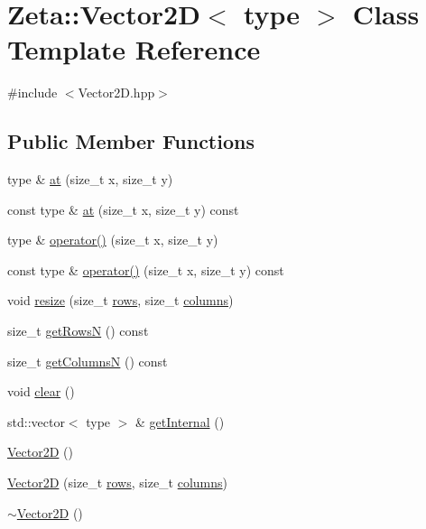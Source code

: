 \hypertarget{classZeta_1_1Vector2D}{\section{Zeta\+:\+:Vector2\+D$<$ type $>$ Class Template Reference}
\label{classZeta_1_1Vector2D}
}


{\ttfamily \#include $<$Vector2\+D.\+hpp$>$}

\subsection*{Public Member Functions}
\begin{DoxyCompactItemize}
\item 
type \& \hyperlink{classZeta_1_1Vector2D_aa5bb07151da5e2ba475078e37a0d9608}{at} (size\+\_\+t x, size\+\_\+t y)
\item 
const type \& \hyperlink{classZeta_1_1Vector2D_a71430a7a1ead2a5bf0a32481e93ca91e}{at} (size\+\_\+t x, size\+\_\+t y) const 
\item 
type \& \hyperlink{classZeta_1_1Vector2D_a05c0ce31d9724e18cfc91bb91300a3ae}{operator()} (size\+\_\+t x, size\+\_\+t y)
\item 
const type \& \hyperlink{classZeta_1_1Vector2D_ad251a6c395f715b33a04d38e53d282e1}{operator()} (size\+\_\+t x, size\+\_\+t y) const 
\item 
void \hyperlink{classZeta_1_1Vector2D_abc4aff7ad467fec2e27e1a3cb00efbe6}{resize} (size\+\_\+t \hyperlink{classZeta_1_1Vector2D_a2aca070e9e69cc69174038b3dd563826}{rows}, size\+\_\+t \hyperlink{classZeta_1_1Vector2D_abd3d1cc04c6700981eb80163689a9f26}{columns})
\item 
size\+\_\+t \hyperlink{classZeta_1_1Vector2D_a2a604f58397c45825bfb0c6e79895c0e}{get\+Rows\+N} () const 
\item 
size\+\_\+t \hyperlink{classZeta_1_1Vector2D_a6636373bd98556043fef4b953ced01df}{get\+Columns\+N} () const 
\item 
void \hyperlink{classZeta_1_1Vector2D_a075af7fb64206600bb641cd16a9a0c3c}{clear} ()
\item 
std\+::vector$<$ type $>$ \& \hyperlink{classZeta_1_1Vector2D_a5104f7b2b243cb3300fd85d2caf85f39}{get\+Internal} ()
\item 
\hyperlink{classZeta_1_1Vector2D_a26d951b60e9710a1d7c371a12d9d65c2}{Vector2\+D} ()
\item 
\hyperlink{classZeta_1_1Vector2D_aa091c3f8e68acc851db042633ac2f5da}{Vector2\+D} (size\+\_\+t \hyperlink{classZeta_1_1Vector2D_a2aca070e9e69cc69174038b3dd563826}{rows}, size\+\_\+t \hyperlink{classZeta_1_1Vector2D_abd3d1cc04c6700981eb80163689a9f26}{columns})
\item 
\hyperlink{classZeta_1_1Vector2D_a615413c722631ee2321c859a261920df}{$\sim$\+Vector2\+D} ()
\end{DoxyCompactItemize}
